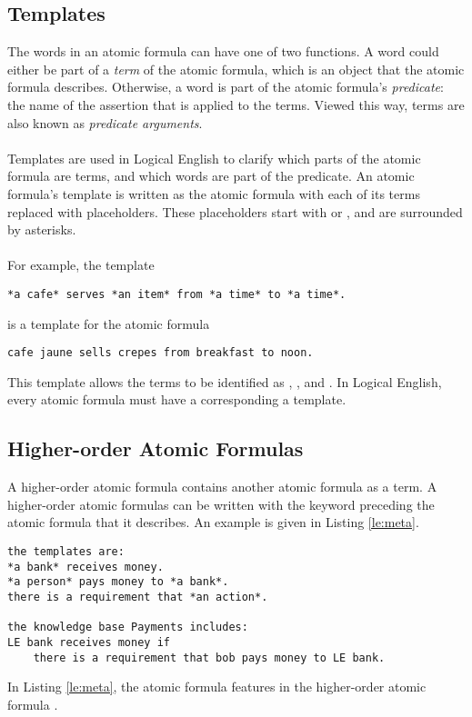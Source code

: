 \documentclass[../main.tex]{subfiles}
\begin{document}
\subsection{Templates}
The words in an atomic formula can have one of two functions. A word could either be part of a \textit{term} of the atomic formula, which is an object that the atomic formula describes. Otherwise, a word is part of the atomic formula's \textit{predicate}: the name of the assertion that is applied to the terms. Viewed this way, terms are also known as \textit{predicate arguments}.
\\
\\
Templates are used in Logical English to clarify which parts of the atomic formula are terms, and which words are part of the predicate. An atomic formula's template is written as the atomic formula with each of its terms replaced with placeholders. These placeholders start with  or , and are surrounded by asterisks. 
\\
\\
For example, the template
\begin{lstlisting}[language={LE},caption={A template in Logical English},label={le:template}]
    *a cafe* serves *an item* from *a time* to *a time*.
\end{lstlisting}
is a template for the atomic formula
\begin{lstlisting}[language={LE}]
    cafe jaune sells crepes from breakfast to noon.
\end{lstlisting}
This template allows the terms to be identified as , ,  and . In Logical English, every atomic formula must have a corresponding a template.

\subsection{Higher-order Atomic Formulas}
A higher-order atomic formula contains another atomic formula as a term. A higher-order atomic formulas can be written with the keyword  preceding the atomic formula that it describes. An example is given in Listing \ref{le:meta}.
\begin{lstlisting}[language=LE,label={le:meta},caption={An example of an atomic formula featuring in a meta atomic formula.}]
the templates are:
*a bank* receives money.
*a person* pays money to *a bank*.
there is a requirement that *an action*.

the knowledge base Payments includes:
LE bank receives money if
    there is a requirement that bob pays money to LE bank.
\end{lstlisting}
In Listing \ref{le:meta}, the atomic formula  features in the higher-order atomic formula .
\end{document}
